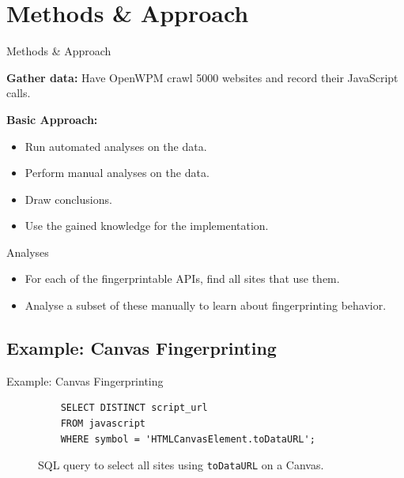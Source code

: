 \documentclass[t]{beamer}
\begin{document}
\section{Methods \& Approach}
\begin{frame}{Methods \& Approach}
    \pause

    \textbf{Gather data:} Have OpenWPM crawl 5000 websites and record their JavaScript calls.
    \vspace{0.3cm}

    \pause

    \textbf{Basic Approach:}

    \pause

    \begin{itemize}
        \item Run automated analyses on the data.
        \pause
        \item Perform manual analyses on the data.
        \pause
        \item Draw conclusions.
        \pause
        \item Use the gained knowledge for the implementation.
    \end{itemize}
\end{frame}

\begin{frame}{Analyses}
    \begin{itemize}
        \item For each of the fingerprintable APIs, find all sites that use them.
        \item Analyse a subset of these manually to learn about fingerprinting behavior.
    \end{itemize}
\end{frame}

\subsection*{Example: Canvas Fingerprinting}
\begin{frame}[fragile]{Example: Canvas Fingerprinting}
    \begin{figure}
    \begin{verbatim}
    SELECT DISTINCT script_url
    FROM javascript
    WHERE symbol = 'HTMLCanvasElement.toDataURL';
    \end{verbatim}
    \caption{SQL query to select all sites using \texttt{toDataURL} on a Canvas.}
    \end{figure}
\end{frame}
\end{document}
